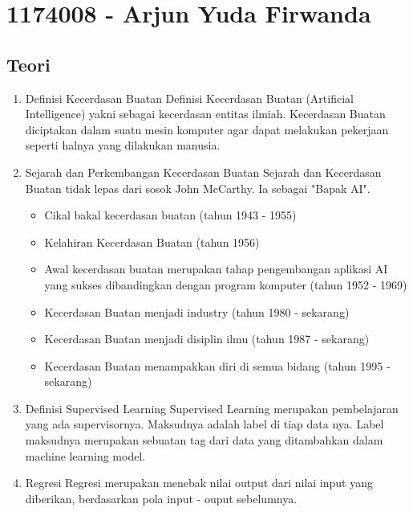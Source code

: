 \section{1174008 - Arjun Yuda Firwanda}
\subsection{Teori}
\begin{enumerate}
	\item Definisi Kecerdasan Buatan
	\hfill\break
	Definisi Kecerdasan Buatan (Artificial Intelligence) yakni sebagai kecerdasan entitas ilmiah. Kecerdasan Buatan diciptakan dalam suatu mesin komputer agar dapat melakukan pekerjaan seperti halnya yang dilakukan manusia.
	
	\item Sejarah dan Perkembangan Kecerdasan Buatan
	\hfill\break
	Sejarah dan Kecerdasan Buatan tidak lepas dari sosok John McCarthy. Ia sebagai "Bapak AI".

	\begin{itemize}
		\item Cikal bakal kecerdasan buatan (tahun 1943 - 1955)
		
		\item Kelahiran Kecerdasan Buatan (tahun 1956)
		
		\item Awal kecerdasan buatan merupakan tahap pengembangan aplikasi AI yang sukses dibandingkan dengan program komputer (tahun 1952 - 1969)
		
		\item Kecerdasan Buatan menjadi industry  (tahun 1980 - sekarang)
		
		\item Kecerdasan Buatan menjadi disiplin ilmu (tahun 1987 - sekarang)
		
		\item Kecerdasan Buatan menampakkan diri di semua bidang (tahun 1995 - sekarang)

	\end{itemize}

	\item Definisi Supervised Learning
	\hfill\break
	Supervised Learning merupakan pembelajaran yang ada supervisornya. Maksudnya adalah label di tiap data nya. Label maksudnya merupakan sebuatan tag dari data yang ditambahkan dalam machine learning model.
	
	\item Regresi
	\hfill\break
	Regresi merupakan menebak nilai output dari nilai input yang diberikan, berdasarkan pola input - ouput sebelumnya.


\end{enumerate}
